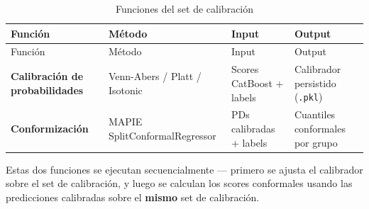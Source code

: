 \documentclass[
  spanish,
  11pt,
  letterpaper,
]{scrbook}
\theoremstyle{plain}
\theoremstyle{remark}
\begin{document}
\begin{longtable}[]{@{}
  >{\raggedright\arraybackslash}p{}
  >{\raggedright\arraybackslash}p{}
  >{\raggedright\arraybackslash}p{}
  >{\raggedright\arraybackslash}p{}@{}}
\caption{Funciones del set de
calibración}\label{tbl-calibration-functions}\tabularnewline
\toprule\noalign{}
\begin{minipage}[b]{\linewidth}\raggedright
Función
\end{minipage} & \begin{minipage}[b]{\linewidth}\raggedright
Método
\end{minipage} & \begin{minipage}[b]{\linewidth}\raggedright
Input
\end{minipage} & \begin{minipage}[b]{\linewidth}\raggedright
Output
\end{minipage} \\
\midrule\noalign{}
\endfirsthead
\toprule\noalign{}
\begin{minipage}[b]{\linewidth}\raggedright
Función
\end{minipage} & \begin{minipage}[b]{\linewidth}\raggedright
Método
\end{minipage} & \begin{minipage}[b]{\linewidth}\raggedright
Input
\end{minipage} & \begin{minipage}[b]{\linewidth}\raggedright
Output
\end{minipage} \\
\midrule\noalign{}
\endhead
\bottomrule\noalign{}
\endlastfoot
\textbf{Calibración de probabilidades} & Venn-Abers / Platt / Isotonic &
Scores CatBoost + labels & Calibrador persistido (\texttt{.pkl}) \\
\textbf{Conformización} & MAPIE SplitConformalRegressor & PDs calibradas
+ labels & Cuantiles conformales por grupo \\
\end{longtable}

Estas dos funciones se ejecutan secuencialmente --- primero se ajusta el
calibrador sobre el set de calibración, y luego se calculan los scores
conformales usando las predicciones calibradas sobre el \textbf{mismo}
set de calibración.
\end{document}
